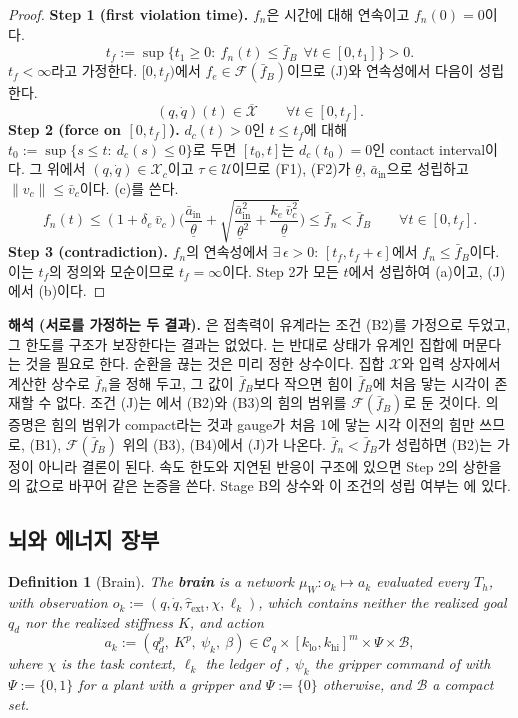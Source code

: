 \documentclass[11pt]{article}\usepackage[margin=1in]{geometry}\usepackage{amsmath,amssymb,amsthm,mathtools}\usepackage{graphicx}\graphicspath{{figures/}{../figures/}{figs/}{./}}\usepackage{enumitem}\usepackage{hyperref}\usepackage{cleveref}\usepackage{tikz}\usetikzlibrary{arrows.meta,positioning,calc,shapes.geometric}\usepackage{float}\usepackage{rotating}\usepackage[most]{tcolorbox}\usepackage{kotex}\usepackage{booktabs}\usepackage{longtable}\emergencystretch=1.6em\tolerance=2000 \crefname{assumption}{Assumption}{Assumptions}\Crefname{assumption}{Assumption}{Assumptions}\crefname{definition}{Definition}{Definitions}\Crefname{definition}{Definition}{Definitions}\crefname{proposition}{Proposition}{Propositions}\Crefname{proposition}{Proposition}{Propositions}\crefname{fact}{Fact}{Facts}\Crefname{fact}{Fact}{Facts} \newtheorem{assumption}{Assumption}\newtheorem{definition}{Definition}\newtheorem{lemma}{Lemma}\newtheorem{proposition}{Proposition}\newtheorem{theorem}{Theorem}\newtheorem{corollary}{Corollary}\newtheorem{fact}{Fact}\theoremstyle{remark}\newtheorem{remark}{Remark} \newcommand{\R}{\mathbb{R}}\newcommand{\xb}{\bar x}\newcommand{\Ab}{\bar A}\newcommand{\By}{\bar B_y}\newcommand{\U}{\mathcal U}\newcommand{\Z}{\mathcal Z}
\begin{document}
\begin{proof}
\textbf{Step 1 (first violation time).} $f_n$은 시간에 대해 연속이고 $f_n(0)=0$이다.
\[
t_f:=\sup\{t_1\ge0:\ f_n(t)\le\bar f_B\ \ \forall t\in[0,t_1]\}>0 .
\]
$t_f<\infty$라고 가정한다. $[0,t_f)$에서 $f_e\in\mathcal F(\bar f_B)$이므로 (J)와 연속성에서 다음이 성립한다.
\[
(q,\dot q)(t)\in\overline{\mathcal X}\qquad\forall t\in[0,t_f] .
\]
\textbf{Step 2 (force on $[0,t_f]$).} $d_c(t)>0$인 $t\le t_f$에 대해 $t_0:=\sup\{s\le t:\ d_c(s)\le0\}$로 두면 $[t_0,t]$는 $d_c(t_0)=0$인 contact interval이다. 그 위에서 $(q,\dot q)\in\mathcal X_c$이고 $\tau\in\U$이므로 (F1), (F2)가 $\underline\theta$, $\bar a_{\mathrm{in}}$으로 성립하고 $\|v_c\|\le\bar v_c$이다. (c)를 쓴다.
\[
f_n(t)\le(1+\delta_e\,\bar v_c)\Big(\frac{\bar a_{\mathrm{in}}}{\underline\theta}+\sqrt{\frac{\bar a_{\mathrm{in}}^2}{\underline\theta^2}+\frac{k_e\,\bar v_c^2}{\underline\theta}}\Big)\le\bar f_n<\bar f_B\qquad\forall t\in[0,t_f] .
\]
\textbf{Step 3 (contradiction).} $f_n$의 연속성에서 $\exists\,\epsilon>0$: $[t_f,t_f+\epsilon]$에서 $f_n\le\bar f_B$이다. 이는 $t_f$의 정의와 모순이므로 $t_f=\infty$이다. Step 2가 모든 $t$에서 성립하여 (a)이고, (J)에서 (b)이다.
\end{proof}

\textbf{해석 (서로를 가정하는 두 결과).} 은 접촉력이 유계라는 조건 (B2)를 가정으로 두었고, 그 한도를 구조가 보장한다는 결과는 없었다. 는 반대로 상태가 유계인 집합에 머문다는 것을 필요로 한다. 순환을 끊는 것은 미리 정한 상수이다. 집합 $\mathcal X$와 입력 상자에서 계산한 상수로 $\bar f_n$을 정해 두고, 그 값이 $\bar f_B$보다 작으면 힘이 $\bar f_B$에 처음 닿는 시각이 존재할 수 없다. 조건 (J)는 에서 (B2)와 (B3)의 힘의 범위를 $\mathcal F(\bar f_B)$로 둔 것이다. 의 증명은 힘의 범위가 compact라는 것과 gauge가 처음 1에 닿는 시각 이전의 힘만 쓰므로, (B1), $\mathcal F(\bar f_B)$ 위의 (B3), (B4)에서 (J)가 나온다. $\bar f_n<\bar f_B$가 성립하면 (B2)는 가정이 아니라 결론이 된다. 속도 한도와 지연된 반응이 구조에 있으면 Step 2의 상한을 의 값으로 바꾸어 같은 논증을 쓴다. Stage B의 상수와 이 조건의 성립 여부는 에 있다.

\subsection{뇌와 에너지 장부}

\begin{definition}[Brain]
\label{def:brain}
The \textbf{\emph{brain}} is a network $\mu_W:o_k\mapsto a_k$ evaluated every $T_h$, with observation $o_k:=(q,\dot q,\hat\tau_{\mathrm{ext}},\chi,\ell_k)$, which contains neither the realized goal $q_d$ nor the realized stiffness $K$, and action
\[
a_k:=(q_d^p,\ K^p,\ \psi_k,\ \beta)\in\mathcal C_q\times[k_{\mathrm{lo}},k_{\mathrm{hi}}]^m\times\Psi\times\mathcal B,
\]
where $\chi$ is the task context, $\ell_k$ the ledger of , $\psi_k$ the gripper command of  with $\Psi:=\{0,1\}$ for a plant with a gripper and $\Psi:=\{0\}$ otherwise, and $\mathcal B$ a compact set.
\end{definition}
\end{document}
